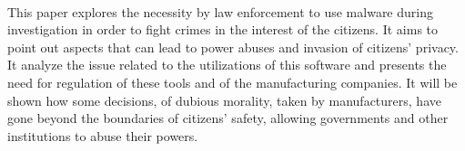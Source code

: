 \paragraph{}
This paper explores the necessity by law enforcement to use malware during investigation in order to fight crimes in the interest of the citizens. It aims to point out aspects that can lead to power abuses and invasion of citizens' privacy. It analyze the issue related to the utilizations of this software and presents the need for regulation of these tools and of the manufacturing companies. It will be shown how some decisions, of dubious morality, taken by manufacturers, have gone beyond the boundaries of citizens' safety, allowing governments and other institutions to abuse their powers.